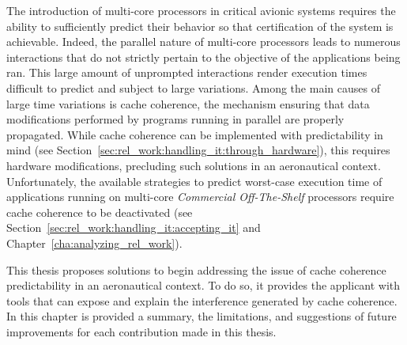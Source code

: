 The introduction of multi-core processors in critical avionic systems requires
the ability to sufficiently predict their behavior so that certification of the
system is achievable. Indeed, the parallel nature of multi-core processors
leads to numerous interactions that do not strictly pertain to the objective
of the applications being ran. This large amount of unprompted interactions
render execution times difficult to predict and subject to large variations.
Among the main causes of large time variations is cache coherence, the
mechanism ensuring that data modifications performed by programs running in
parallel are properly propagated. While cache coherence can be implemented with
predictability in mind (see
Section~\ref{sec:rel_work:handling_it:through_hardware}), this requires hardware
modifications, precluding such solutions in an aeronautical context.
Unfortunately, the available strategies to predict worst-case execution time of
applications running on multi-core \textit{Commercial Off-The-Shelf} processors
require cache coherence to be deactivated (see
Section~\ref{sec:rel_work:handling_it:accepting_it} and
Chapter~\ref{cha:analyzing_rel_work}).

This thesis proposes solutions to begin addressing the issue of cache coherence
predictability in an aeronautical context. To do so, it provides the applicant
with tools that can expose and explain the interference generated by cache
coherence. In this chapter is provided a summary, the limitations, and
suggestions of future improvements for each contribution made in this thesis.
